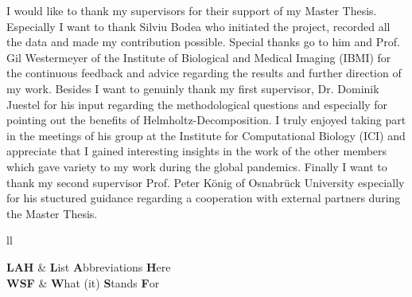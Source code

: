 \documentclass[
11pt, %
oneside, %
english, %
singlespacing, %
parskip, %
headsepline, %
]{MastersDoctoralThesis} %
\begin{document}
\begin{acknowledgements}
\addchaptertocentry{\acknowledgementname} %
I would like to thank my supervisors for their support of my Master Thesis. Especially I want to thank Silviu Bodea who initiated the project, recorded all the data and made my contribution possible. Special thanks go to him and Prof. Gil Westermeyer of the Institute of Biological and Medical Imaging (IBMI) for the continuous feedback and advice regarding the results and further direction of my work. Besides I want to genuinly thank my first supervisor, Dr. Dominik Juestel for his input regarding the methodological questions and especially for pointing out the benefits of Helmholtz-Decomposition. I truly enjoyed taking part in the meetings of his group at the Institute for Computational Biology (ICI) and appreciate that I gained interesting insights in the work of the other members which gave variety to my work during the global pandemics. Finally I want to thank my second supervisor Prof. Peter König of Osnabrück University especially for his stuctured guidance regarding a cooperation with external partners during the Master Thesis.
\end{acknowledgements}


\tableofcontents %

\listoffigures %



\begin{abbreviations}{ll} %

\textbf{LAH} & \textbf{L}ist \textbf{A}bbreviations \textbf{H}ere\\
\textbf{WSF} & \textbf{W}hat (it) \textbf{S}tands \textbf{F}or\\

\end{abbreviations}

\end{document}
